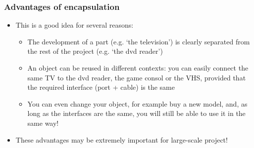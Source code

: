 \documentclass[9pt]{beamer}
\begin{document}
\begin{frame}
  \frametitle{Advantages of encapsulation}
  
  \begin{itemize}
    \item This is a good idea for several reasons:
    
    \medskip
    
    \begin{itemize}
      \item The development of a part (e.g. `the television') is clearly separated
            from the rest of the project (e.g. `the dvd reader')
      \medskip
      \item An object can be reused in different contexts: you can easily connect
            the same TV to the dvd reader, the game consol or the VHS, 
            provided that the required interface (port + cable) is the same
      \medskip
      \item You can even change your object, for example buy a new model,
            and, as long as the interfaces are the same, you will still be able 
            to use it in the same way!
    \end{itemize}
    
    \medskip
  
    \item These advantages may be extremely important for large-scale project!

  \end{itemize}

\end{frame}


%  
\end{document}
